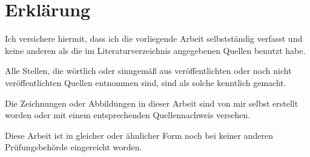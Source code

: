\chapter*{Erklärung}
\thispagestyle{empty}
\noindent
Ich versichere hiermit, dass ich die vorliegende Arbeit selbstständig verfasst und keine anderen als die im Literaturverzeichnis angegebenen Quellen benutzt habe.

Alle Stellen, die wörtlich oder sinngemäß aus veröffentlichten oder noch nicht veröffentlichten Quellen entnommen sind, sind als solche kenntlich gemacht.

Die Zeichnungen oder Abbildungen in dieser Arbeit sind von mir selbst erstellt worden oder mit einem entsprechenden Quellennachweis versehen.

Diese Arbeit ist in gleicher oder ähnlicher Form noch bei keiner anderen Prüfungsbehörde eingereicht worden.

\bigskip
\bigskip
\bigskip
\noindent
\myTime\hfill \underline{\hspace{8cm}} \\[0.3em]
\hfill \makebox[21cm]{\myName}